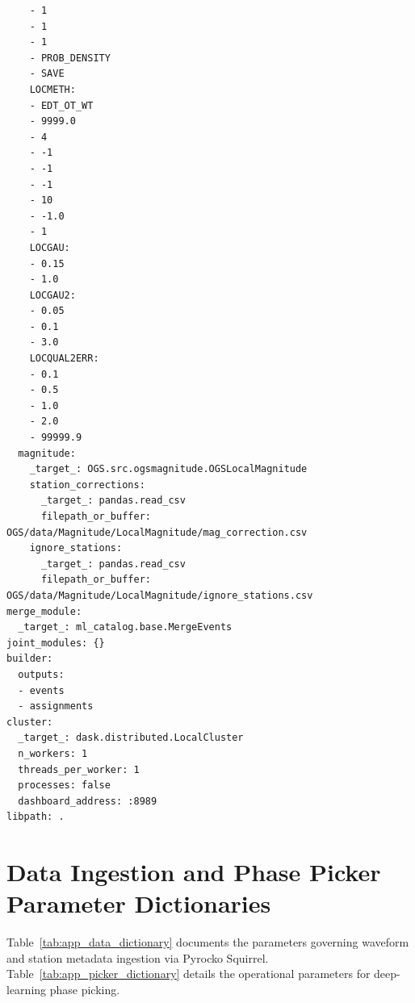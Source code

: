 \begin{lstlisting}
    - 1
    - 1
    - 1
    - PROB_DENSITY
    - SAVE
    LOCMETH:
    - EDT_OT_WT
    - 9999.0
    - 4
    - -1
    - -1
    - -1
    - 10
    - -1.0
    - 1
    LOCGAU:
    - 0.15
    - 1.0
    LOCGAU2:
    - 0.05
    - 0.1
    - 3.0
    LOCQUAL2ERR:
    - 0.1
    - 0.5
    - 1.0
    - 2.0
    - 99999.9
  magnitude:
    _target_: OGS.src.ogsmagnitude.OGSLocalMagnitude
    station_corrections:
      _target_: pandas.read_csv
      filepath_or_buffer: OGS/data/Magnitude/LocalMagnitude/mag_correction.csv
    ignore_stations:
      _target_: pandas.read_csv
      filepath_or_buffer: OGS/data/Magnitude/LocalMagnitude/ignore_stations.csv
merge_module:
  _target_: ml_catalog.base.MergeEvents
joint_modules: {}
builder:
  outputs:
  - events
  - assignments
cluster:
  _target_: dask.distributed.LocalCluster
  n_workers: 1
  threads_per_worker: 1
  processes: false
  dashboard_address: :8989
libpath: .
\end{lstlisting}

\section{Data Ingestion and Phase Picker Parameter Dictionaries}
\label{sec:app_data_params}

Table~\ref{tab:app_data_dictionary} documents the parameters governing waveform and station metadata ingestion via Pyrocko Squirrel. Table~\ref{tab:app_picker_dictionary} details the operational parameters for deep-learning phase picking.

